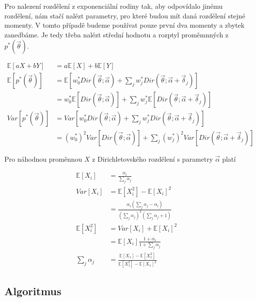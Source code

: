 Pro nalezení rozdělení z exponenciální rodiny tak, aby odpovídalo jinému
rozdělení, nám stačí nalézt parametry, pro které budou mít daná rozdělení
stejné momenty. V tomto případě budeme používat pouze první dva momenty a
zbytek zanedbáme. Je tedy třeba nalézt střední hodnotu a rozptyl
proměmnných z $p^*(\vec\theta)$.

\begin{align}
\mathbb{E}[aX+bY] &= a\mathbb{E}[X] + b\mathbb{E}[Y]
\\
\mathbb{E}[p^*(\vec{\theta})] &= \mathbb{E}
    \left[
        w_0^* Dir(\vec{\theta}; \vec{\alpha}) +
        \sum_j w^*_j
            Dir(\vec{\theta}; \vec{\alpha} + \vec{\delta}_j)
    \right]
\\
&= w_0^* \mathbb{E}[Dir(\vec\theta; \vec\alpha)] +
    \sum_j w_j^* \mathbb{E}[Dir(\vec\theta; \vec\alpha + \vec{\delta}_j)]
\\
Var[p^*(\vec\theta)] &= Var
    \left[
        w_0^* Dir(\vec{\theta}; \vec{\alpha}) +
        \sum_j w^*_j
            Dir(\vec{\theta}; \vec{\alpha} + \vec{\delta}_j)
    \right]
\\
&= (w_0^*)^2 Var[Dir(\vec\theta; \vec\alpha)] + \sum_j (w_j^*)^2
Var[Dir(\vec\theta; \vec\alpha + \vec{\delta}_j)]
\end{align}

Pro náhodnou proměnnou $X$ z Dirichletovského rozdělení s parametry
$\vec\alpha$ platí

\begin{align}
\mathbb{E}[X_i] &= \frac{\alpha_i}{\sum_j \alpha_j}
\\
Var[X_i] &= \mathbb{E}[X_i^2] - \mathbb{E}[X_i]^2
\\
&= \frac{\alpha_i (\sum_j \alpha_j - \alpha_i)}
                 {(\sum_j \alpha_j)^2 (\sum_j \alpha_j + 1)}
\\
\mathbb{E}[X_i^2] &= Var[X_i] + \mathbb{E}[X_i]^2
\\
&= \mathbb{E}[X_i] \frac{1 + \alpha_i}{1 + \sum_j
    \alpha_j}
\\
\sum_j \alpha_j &= \frac{\mathbb{E}[X_1] - \mathbb{E}[X_1^2]}
                        {\mathbb{E}[X_1^2] - \mathbb{E}[X_1]^2}
\end{align}

\subsection{Algoritmus}

